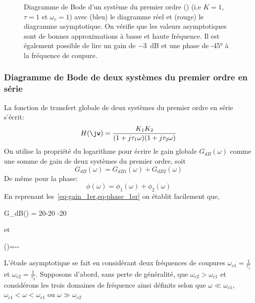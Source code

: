 \afterpage{\clearpage}
\begin{figure}[!t]
\centering
{}



\caption{Diagramme de Bode d'un système du premier ordre 
         () (i.e $K=1$, $\tau=1$ et $\omega_c=1$) avec 
         (bleu) le diagramme réel et (rouge) le diagramme asymptotique. On 
         vérifie que les valeurs asymptotiques sont de bonnes approximations 
         à basse et haute fréquence. Il est également possible de lire un 
         gain de \SI{-3}{\dB} et une phase de -45\si{\degree} à la fréquence 
         de coupure.\label{fig-bode_1er_3}}
\end{figure}

\subsubsection{Diagramme de Bode de deux systèmes du premier ordre en série }
La fonction de transfert globale de deux systèmes du premier ordre en série 
s'écrit:
\begin{align}
H(\jw)=\dfrac{K_1K_2}{(1+j\tau_1\omega)(1+j\tau_2\omega)}\label{eq-1er_serie}
\end{align}
On utilise la propriété du logarithme pour écrire le gain globale 
$G_{dB}(\omega)$ comme une somme de gain de deux systèmes du premier ordre, 
soit
$$
G_{dB}(\omega) = G_{dB1}(\omega) + G_{dB2}(\omega)
$$
De même pour la phase:
$$
\phi(\omega)= \phi_1(\omega) + \phi_2(\omega)
$$
En reprenant les~\cref{eq-gain_1er,eq-phase_1er} on établit facilement que,
\begin{bequation}
G_{dB}(\omega) = 20-20
                -20
\end{bequation}
et
\begin{bequation}
\phi(\omega)=-\arctan{\tau_1\omega}-\arctan{\tau_2\omega}
\end{bequation}
L'étude asymptotique se fait en considérant deux fréquences de coupures 
$\omega_{c1}=\frac{1}{\tau_1}$ et $\omega_{c2}=\frac{1}{\tau_2}$.
Supposons d'abord, sans perte de généralité, que $\omega_{c2}>\omega_{c1}$ et 
considérons 
les trois domaines de fréquence ainsi définits selon que 
$\omega\ll\omega_{c1}$, $\omega_{c1}<\omega<\omega_{c1}$ ou 
$\omega\gg\omega_{c2}$
